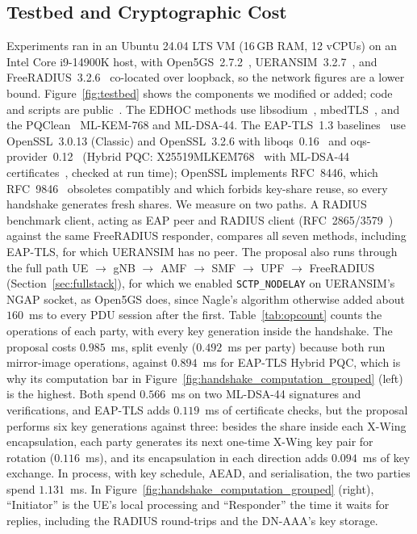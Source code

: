 \documentclass[symmetry,article,submit,moreauthors]{Definitions/mdpi}
\begin{document}
\subsection{Testbed and Cryptographic Cost}
Experiments ran in an Ubuntu 24.04 LTS VM (16\,GB RAM, 12 vCPUs) on an Intel Core i9-14900K host, with Open5GS~2.7.2~\cite{Open5GS}, UERANSIM~3.2.7~\cite{UERANSIM}, and FreeRADIUS~3.2.6~\cite{FreeRADIUS} co-located over loopback, so the network figures are a lower bound. Figure~\ref{fig:testbed} shows the components we modified or added; code and scripts are public~\cite{ProVerifSrc}. The EDHOC methods use libsodium~\cite{libsodium}, mbedTLS~\cite{mbedtls}, and the PQClean~\cite{pqclean} ML-KEM-768 and ML-DSA-44. The EAP-TLS~1.3 baselines~\cite{RFC9190} use OpenSSL~3.0.13 (Classic) and OpenSSL~3.2.6 with liboqs~0.16~\cite{liboqs} and oqs-provider~0.12~\cite{openssl_oqs} (Hybrid PQC: X25519MLKEM768~\cite{RFC10024} with ML-DSA-44 certificates~\cite{RFC9881,MLDSATLS}, checked at run time); OpenSSL implements RFC~8446, which RFC~9846~\cite{RFC9846} obsoletes compatibly and which forbids key-share reuse, so every handshake generates fresh shares. We measure on two paths. A RADIUS benchmark client, acting as EAP peer and RADIUS client (RFC~2865/3579~\cite{RFC2865,RFC3579}) against the same FreeRADIUS responder, compares all seven methods, including EAP-TLS, for which UERANSIM has no peer. The proposal also runs through the full path UE $\to$ gNB $\to$ AMF $\to$ SMF $\to$ UPF $\to$ FreeRADIUS (Section~\ref{sec:fullstack}), for which we enabled \texttt{SCTP\_NODELAY} on UERANSIM's NGAP socket, as Open5GS does, since Nagle's algorithm otherwise added about $160$~ms to every PDU session after the first. Table~\ref{tab:opcount} counts the operations of each party, with every key generation inside the handshake. The proposal costs $0.985$~ms, split evenly ($0.492$~ms per party) because both run mirror-image operations, against $0.894$~ms for EAP-TLS Hybrid PQC, which is why its computation bar in Figure~\ref{fig:handshake_computation_grouped} (left) is the highest. Both spend $0.566$~ms on two ML-DSA-44 signatures and verifications, and EAP-TLS adds $0.119$~ms of certificate checks, but the proposal performs six key generations against three: besides the share inside each X-Wing encapsulation, each party generates its next one-time X-Wing key pair for rotation ($0.116$~ms), and its encapsulation in each direction adds $0.094$~ms of key exchange. In process, with key schedule, AEAD, and serialisation, the two parties spend $1.131$~ms. In Figure~\ref{fig:handshake_computation_grouped} (right), ``Initiator'' is the UE's local processing and ``Responder'' the time it waits for replies, including the RADIUS round-trips and the DN-AAA's key storage.
\end{document}

